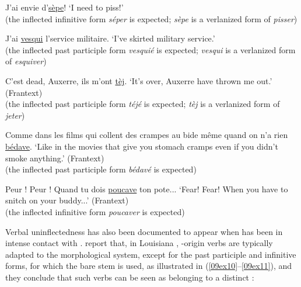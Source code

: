 \documentclass[output=paper,colorlinks,citecolor=brown]{langscibook}
\begin{document}
\begin{exe}
	\ex \label{09ex5} J'ai envie d'\ul{sèpe}!
	\trans ‘I need to piss!’ \hfill \citep{tengour2024} \\
	(the inflected infinitive form \emph{séper} is expected; \emph{sèpe} is a verlanized form of \emph{pisser})
	
	\ex J'ai \ul{vesqui} l'service militaire.
	\trans ‘I've skirted military service.’ \hfill \citep{tengour2024} \\
	(the inflected past participle form \emph{vesquié} is expected; \emph{vesqui} is a verlanized form of \emph{esquiver})
	
	\ex \label{09ex7} C'est dead, Auxerre, ils m'ont \ul{tèj}.
	\trans ‘It's over, Auxerre have thrown me out.’ \hfill (Frantext)\nocite{frantext-noaccess}  \\
	(the inflected past participle form \emph{téjé} is expected; \emph{tèj} is a verlanized form of \emph{jeter})
	
	\ex \label{09ex8} Comme dans les films qui collent des crampes au bide même quand on n'a rien \ul{bédave}.
	\trans ‘Like in the movies that give you stomach cramps even if you didn't smoke anything.’ \hfill (Frantext)\nocite{frantext-noaccess} \\
	(the inflected past participle form \emph{bédavé} is expected)
	
	\ex \label{09ex9} Peur ! Peur ! Quand tu dois \ul{poucave} ton pote...
	\trans ‘Fear! Fear! When you have to snitch on your buddy...’ \hfill (Frantext)\nocite{frantext-noaccess}  \\
	(the inflected infinitive form \emph{poucaver} is expected)
\end{exe}

Verbal uninflectedness has also been documented to appear when  has been in intense contact with . \citet{duboissankoff1997} report that, in Louisiana , -origin verbs are typically adapted to the  morphological system, except for the past participle and infinitive forms, for which the bare stem is used, as illustrated in (\ref{09ex10}--\ref{09ex11}), and they conclude that such verbs can be seen as belonging to a distinct :
\end{document}
